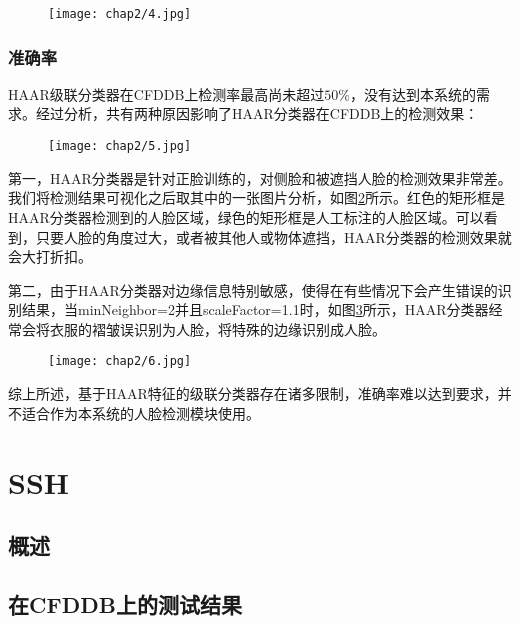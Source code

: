 \begin{figure}[!htp]
	\centering
	\texttt{[image: chap2/4.jpg]}
	\label{fig:haartest:speed}
\end{figure}

\subsubsection{准确率}

HAAR级联分类器在CFDDB上检测率最高尚未超过$50\%$，没有达到本系统的需求。经过分析，共有两种原因影响了HAAR分类器在CFDDB上的检测效果：

\begin{figure}[!htp]
	\centering
	\texttt{[image: chap2/5.jpg]}
	\label{fig:haartest:acc}
\end{figure}

第一，HAAR分类器是针对正脸训练的，对侧脸和被遮挡人脸的检测效果非常差。我们将检测结果可视化之后取其中的一张图片分析，如图\ref{fig:haartest:acc}所示。红色的矩形框是HAAR分类器检测到的人脸区域，绿色的矩形框是人工标注的人脸区域。可以看到，只要人脸的角度过大，或者被其他人或物体遮挡，HAAR分类器的检测效果就会大打折扣。

第二，由于HAAR分类器对边缘信息特别敏感，使得在有些情况下会产生错误的识别结果，当minNeighbor=2并且scaleFactor=1.1时，如图\ref{fig:haartest:acc2}所示，HAAR分类器经常会将衣服的褶皱误识别为人脸，将特殊的边缘识别成人脸。

\begin{figure}[!htp]
	\centering
	\texttt{[image: chap2/6.jpg]}
	\label{fig:haartest:acc2}
\end{figure}

综上所述，基于HAAR特征的级联分类器存在诸多限制，准确率难以达到要求，并不适合作为本系统的人脸检测模块使用。


\section{SSH}

\subsection{概述}

\subsection{在CFDDB上的测试结果}

